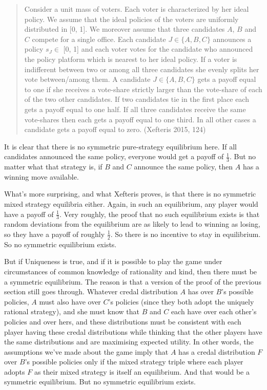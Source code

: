 \documentclass[
  11pt,
]{article}
\begin{document}
\begin{quote}
Consider a unit mass of voters. Each voter is characterized by her ideal policy. We assume that the ideal policies of the voters are uniformly distributed in {[}0, 1{]}. We moreover assume that three candidates \(A\), \(B\) and \(C\) compete for a single office. Each candidate \(J \in \{A, B, C\}\) announces a policy \(s_J \in\) {[}0, 1{]} and each voter votes for the candidate who announced the policy platform which is nearest to her ideal policy. If a voter is indifferent between two or among all three candidates she evenly splits her vote between/among them. A candidate \(J \in \{A, B, C\}\) gets a payoff equal to one if she receives a vote-share strictly larger than the vote-share of each of the two other candidates. If two candidates tie in the first place each gets a payoff equal to one half. If all three candidates receive the same vote-shares then each gets a payoff equal to one third. In all other cases a candidate gets a payoff equal to zero. (Xefteris 2015, 124)
\end{quote}

It is clear that there is no symmetric pure-strategy equilibrium here. If all candidates announced the same policy, everyone would get a payoff of \(\frac{1}{3}\). But no matter what that strategy is, if \(B\) and \(C\) announce the same policy, then \(A\) has a winning move available.

What's more surprising, and what Xefteris proves, is that there is no symmetric mixed strategy equilibria either. Again, in such an equilibrium, any player would have a payoff of \(\frac{1}{3}\). Very roughly, the proof that no such equilibrium exists is that random deviations from the equilibrium are as likely to lead to winning as losing, so they have a payoff of roughly \(\frac{1}{2}\). So there is no incentive to stay in equilibrium. So no symmetric equilibrium exists.

But if Uniqueness is true, and if it is possible to play the game under circumstances of common knowledge of rationality and kind, then there must be a symmetric equilibrium. The reason is that a version of the proof of the previous section still goes through. Whatever credal distribution \(A\) has over \(B\)'s possible policies, \(A\) must also have over \(C\)'s policies (since they both adopt the uniquely rational strategy), and she must know that \(B\) and \(C\) each have over each other's policies and over hers, and these distributions must be consistent with each player having these credal distributions while thinking that the other players have the same distributions and are maximising expected utility. In other words, the assumptions we've made about the game imply that \(A\) has a credal distribution \(F\) over \(B\)'s possible policies only if the mixed strategy triple where each player adopts \(F\) as their mixed strategy is itself an equilibrium. And that would be a symmetric equilibrium. But no symmetric equilibrium exists.
\end{document}
